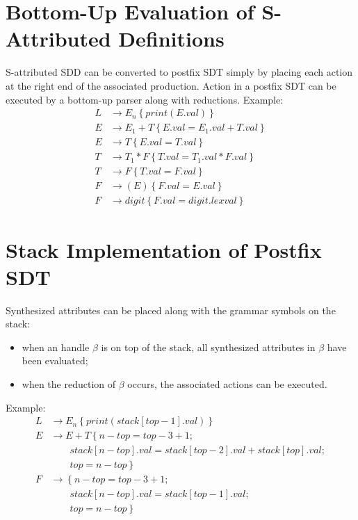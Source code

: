 \section{Bottom-Up Evaluation of S-Attributed Definitions}
S-attributed SDD can be converted to postfix SDT simply by placing each action at the right end of the associated production.
Action in a postfix SDT can be executed by a bottom-up parser along with reductions.
Example:
\begin{align*}
	L &\to E_n \left\{print(E.val)\right\} \\
	E &\to E_1 + T \left\{E.val = E_1.val + T.val\right\} \\
	E &\to T \left\{E.val = T.val\right\} \\
	T &\to T_1 \ast F \left\{T.val = T_1.val \ast F.val\right\} \\
	T &\to F \left\{T.val = F.val\right\} \\
	F &\to (E) \left\{F.val = E.val\right\} \\
	F &\to digit \left\{F.val = digit.lexval\right\}
\end{align*}

\section{Stack Implementation of Postfix SDT}
Synthesized attributes can be placed along with the grammar symbols on the stack:
\begin{itemize}
	\item when an handle $\beta$ is on top of the stack, all synthesized attributes in $\beta$ have been evaluated;
	\item when the reduction of $\beta$ occurs, the associated actions can be executed.
\end{itemize}
Example:
\begin{align*}
	L &\to E_n \left\{print(stack[top -1].val)\right\} \\
	E &\to E + T \left\{n - top = top - 3 + 1; \right. \\
		&\qquad \left. {} stack[n - top].val = stack[top - 2].val + stack[top].val; \right. \\
		&\qquad \left. {} top = n - top\right\} \\
	F &\to \left\{n - top = top - 3 + 1; \right. \\
		&\qquad \left. {} stack[n - top].val = stack[top - 1].val; \right. \\
		&\qquad \left. {} top = n - top\right\}
\end{align*}


